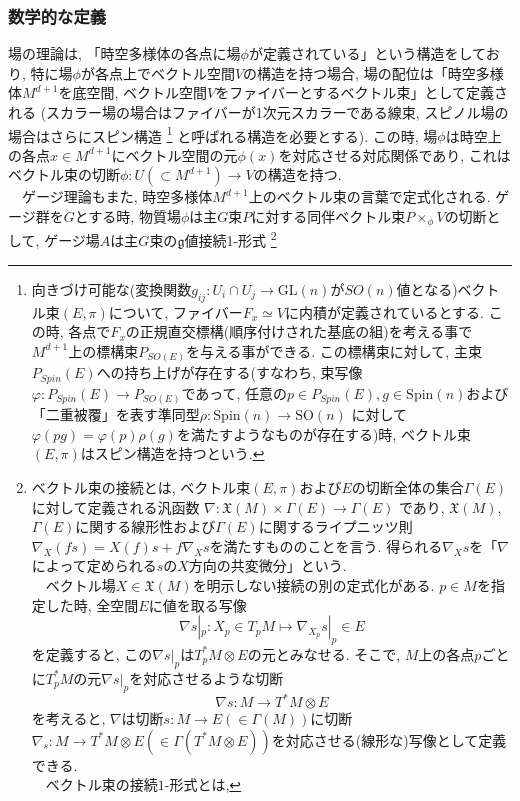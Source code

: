 \subsubsection{数学的な定義}
場の理論は, 「時空多様体の各点に場$\phi$が定義されている」という構造をしており, 
特に場$\phi$が各点上でベクトル空間$V$の構造を持つ場合, 
場の配位は「時空多様体$M^{d+1}$を底空間, ベクトル空間$V$をファイバーとするベクトル束」として定義される
(スカラー場の場合はファイバーが1次元スカラーである線束, スピノル場の場合はさらにスピン構造
\footnote{向きづけ可能な(変換関数$g_{ij}: U_{i}\cap U_j\to \mathrm{GL}(n)$が$SO(n)$値となる)ベクトル束$(E, \pi)$について, 
ファイバー$F_x\simeq V$に内積が定義されているとする. 
この時, 各点で$F_x$の正規直交標構(順序付けされた基底の組)を考える事で
$M^{d+1}$上の標構束$P_{SO(E)}$を与える事ができる. 
この標構束に対して, 主束$P_{Spin}(E)$への持ち上げが存在する(すなわち, 束写像$\varphi: P_{Spin}(E)\to P_{SO(E)}$であって, 
任意の$p\in P_{Spin}(E), g\in \mathrm{Spin}(n)$および「二重被覆」を表す準同型$\rho: \mathrm{Spin}(n)\to \mathrm{SO}(n)$
に対して$\varphi(pg) = \varphi(p)\rho(g)$を満たすようなものが存在する)時, 
ベクトル束$(E, \pi)$はスピン構造を持つという. }%
と呼ばれる構造を必要とする). 
この時, 場$\phi$は時空上の各点$x\in M^{d+1}$にベクトル空間の元$\phi(x)$を対応させる対応関係であり, 
これはベクトル束の切断$\phi: U(\subset M^{d+1})\to V$の構造を持つ. \\
　ゲージ理論もまた, 時空多様体$M^{d+1}$上のベクトル束の言葉で定式化される. 
ゲージ群を$G$とする時, 物質場$\phi$は主$G$束$P$に対する同伴ベクトル束$P\times_\phi V$の切断として, 
ゲージ場$A$は主$G$束の$\mathfrak{g}$値接続1-形式
\footnote{ベクトル束の接続とは, ベクトル束$(E, \pi)$および$E$の切断全体の集合$\Gamma(E)$に対して定義される汎函数
$\nabla : \mathfrak{X}(M)\times \Gamma(E)\to \Gamma(E)$
であり, $\mathfrak{X}(M)$, $\Gamma(E)$に関する線形性および$\Gamma(E)$に関するライプニッツ則
$\nabla_{X}(fs) = X(f)s + f\nabla_X s$を満たすもののことを言う. 
得られる$\nabla_X s$を「$\nabla$によって定められる$s$の$X$方向の共変微分」という. \\
　ベクトル場$X\in \mathfrak{X}(M)$を明示しない接続の別の定式化がある. 
$p\in M$を指定した時, 全空間$E$に値を取る写像
$$\nabla s|_p : X_p\in T_{p}M \mapsto \nabla_{X_p}s|_p \in E$$
を定義すると, この$\nabla s|_p$は$T^{*}_p M\otimes E$の元とみなせる. 
そこで, $M$上の各点$p$ごとに$T^{*}_p M$の元$\nabla s|_p$を対応させるような切断
$$\nabla s: M \to T^{*}M\otimes E$$を考えると, 
$\nabla$は切断$s: M\to E(\in \Gamma(M))$に切断$\nabla_s: M\to T^{*}M\otimes E (\in \Gamma(T^{*}M\otimes E))$を対応させる(線形な)写像として定義できる. \\
　ベクトル束の接続$1$-形式とは, 
}%
